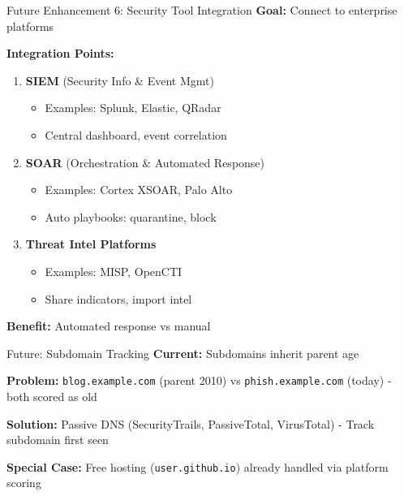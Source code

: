 \documentclass[aspectratio=169]{beamer}
\begin{document}
\begin{frame}{Future Enhancement 6: Security Tool Integration}
\vspace{-0.2cm}
\scriptsize
\textbf{Goal:} Connect to enterprise platforms

\vspace{0.1cm}
\textbf{Integration Points:}

\begin{enumerate}
    \scriptsize
    \setlength\itemsep{-0.1em}
    \item \textbf{SIEM} (Security Info \& Event Mgmt)
    \begin{itemize}
        \scriptsize
        \setlength\itemsep{-0.1em}
        \item Examples: Splunk, Elastic, QRadar
        \item Central dashboard, event correlation
    \end{itemize}
    
    \item \textbf{SOAR} (Orchestration \& Automated Response)
    \begin{itemize}
        \scriptsize
        \item Examples: Cortex XSOAR, Palo Alto
        \item Auto playbooks: quarantine, block
    \end{itemize}
    
    \item \textbf{Threat Intel Platforms}
    \begin{itemize}
        \scriptsize
        \item Examples: MISP, OpenCTI
        \item Share indicators, import intel
    \end{itemize}
\end{enumerate}

\vspace{0.1cm}
\scriptsize
\textbf{Benefit:} Automated response vs manual
\end{frame}

\begin{frame}{Future: Subdomain Tracking}
\vspace*{-0.4cm}
\scriptsize
\textbf{Current:} Subdomains inherit parent age

\vspace{0.05cm}
\textbf{Problem:} \texttt{blog.example.com} (parent 2010) vs \texttt{phish.example.com} (today) - both scored as old

\vspace{0.05cm}
\textbf{Solution:} Passive DNS (SecurityTrails, PassiveTotal, VirusTotal) - Track subdomain first seen

\vspace{0.1cm}
\textbf{Special Case:} Free hosting (\texttt{user.github.io}) already handled via platform scoring
\end{frame}
\end{document}
